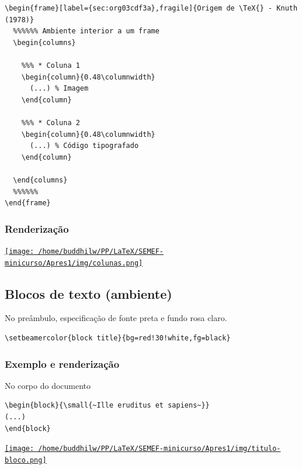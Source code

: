 \documentclass[11pt]{article}
\begin{document}
\begin{verbatim}
\begin{frame}[label={sec:org03cdf3a},fragile]{Origem de \TeX{} - Knuth (1978)}
  %%%%%% Ambiente interior a um frame
  \begin{columns}

    %%% * Coluna 1
    \begin{column}{0.48\columnwidth}
      (...) % Imagem
    \end{column}

    %%% * Coluna 2
    \begin{column}{0.48\columnwidth} 
      (...) % Código tipografado
    \end{column}

  \end{columns}
  %%%%%% 
\end{frame}
\end{verbatim}
\subsubsection{Renderização}
\label{sec:orgd4117ef}
\href{img/colunas.png}{\texttt{[image: /home/buddhilw/PP/LaTeX/SEMEF-minicurso/Apres1/img/colunas.png]}}

\subsection{Blocos de texto (ambiente)}
\label{sec:org805f744}
No preâmbulo, especificação de fonte preta e fundo rosa claro.
\begin{verbatim}
\setbeamercolor{block title}{bg=red!30!white,fg=black}
\end{verbatim}

\subsubsection{Exemplo e renderização}
\label{sec:org3c31970}
No corpo do documento
\begin{verbatim}
\begin{block}{\small{~Ille eruditus et sapiens~}}
(...)
\end{block}
\end{verbatim}

\href{img/titulo-bloco.png}{\texttt{[image: /home/buddhilw/PP/LaTeX/SEMEF-minicurso/Apres1/img/titulo-bloco.png]}}
\end{document}
